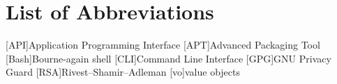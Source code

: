 \chapter*{List of Abbreviations} 

\begin{acronym}
	
	[API]{Application Programming Interface}
	[APT]{Advanced Packaging Tool}
	[Bash]{Bourne-again shell}
	[CLI]{Command Line Interface}
	[GPG]{GNU Privacy Guard}
	[RSA]{Rivest–Shamir–Adleman}
	[vo]{value objects}
	
	
\end{acronym}